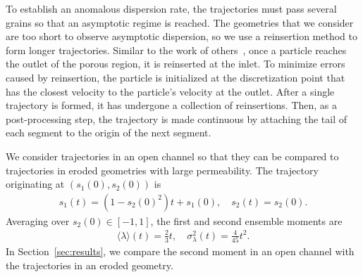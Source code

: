 \documentclass{jfm}
\begin{document}
To establish an anomalous dispersion rate, the trajectories must pass
several grains so that an asymptotic regime is reached. The geometries
that we consider are too short to observe asymptotic dispersion, so we
use a reinsertion method to form longer trajectories. Similar to the
work of others~\citep{dea-qua-bir-jua2018, puy-gou-den2019}, once a
particle reaches the outlet of the porous region, it is reinserted at
the inlet.  To minimize errors caused by reinsertion, the particle is
initialized at the discretization point that has the closest velocity to
the particle's velocity at the outlet.  After a single trajectory is
formed, it has undergone a collection of reinsertions.  Then, as a
post-processing step, the trajectory is made continuous by attaching the
tail of each segment to the origin of the next segment.

We consider trajectories in an open channel so that they can be compared
to trajectories in eroded geometries with large permeability.  The
trajectory originating at $(s_1(0),s_2(0))$ is
\begin{align}
  s_1(t) = (1-s_2(0)^2)t + s_1(0), \quad
  s_2(t) = s_2(0).
\end{align}
Averaging over $s_2(0) \in [-1,1]$, the first and second ensemble
moments are
\begin{align}
  \langle \lambda \rangle (t) = \frac{2}{3}t, \quad 
    \sigma_\lambda^2(t) = \frac{4}{45}t^2.
\end{align}
In Section~\ref{sec:results}, we compare the second moment in an open
channel with the trajectories in an eroded geometry.

\end{document}

